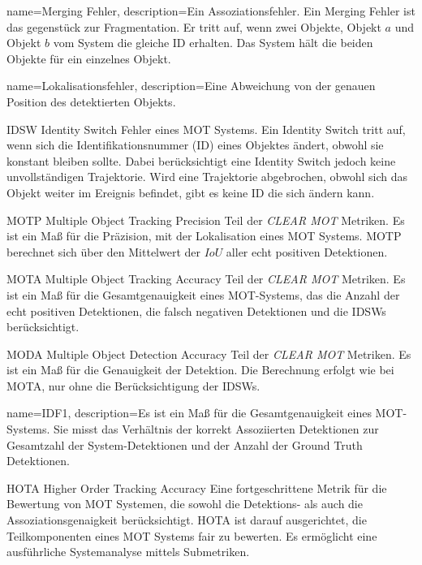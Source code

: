 {
name=Merging Fehler,
description={Ein Assoziationsfehler. Ein Merging Fehler ist das gegenstück zur Fragmentation. Er tritt auf, wenn zwei Objekte, Objekt \(a\) und Objekt \(b\) vom System die gleiche ID erhalten. Das System hält die beiden Objekte für ein einzelnes Objekt.}
}

{
name=Lokalisationsfehler,
description={Eine Abweichung von der genauen Position des detektierten Objekts.}
}

\newglossaryentrywithacronym
{IDSW}
{Identity Switch}
{Fehler eines MOT Systems. Ein Identity Switch tritt auf, wenn sich die Identifikationsnummer (ID) eines Objektes ändert, obwohl sie konstant bleiben sollte. Dabei berücksichtigt eine Identity Switch jedoch keine unvollständigen Trajektorie. Wird eine Trajektorie
abgebrochen, obwohl sich das Objekt weiter im Ereignis befindet, gibt es keine ID die sich
ändern kann.}


\newglossaryentrywithacronym
{MOTP}
{Multiple Object Tracking Precision}
{Teil der \textit{\acrshort{CLEAR} \gls{MOT}} Metriken. Es ist ein Maß für die Präzision, mit der Lokalisation eines MOT Systems. MOTP berechnet sich über den Mittelwert der \(IoU\) aller echt positiven Detektionen.}

\newglossaryentrywithacronym
{MOTA}
{Multiple Object Tracking Accuracy}
{Teil der \textit{\acrshort{CLEAR} \gls{MOT}} Metriken. Es ist ein Maß für die Gesamtgenauigkeit eines MOT-Systems, das die Anzahl der echt positiven Detektionen, die falsch negativen Detektionen und die IDSWs berücksichtigt.}

\newglossaryentrywithacronym
{MODA}
{Multiple Object Detection Accuracy}
{Teil der \textit{\acrshort{CLEAR} \gls{MOT}} Metriken. Es ist ein Maß für die Genauigkeit der Detektion. Die Berechnung erfolgt wie bei MOTA, nur ohne die Berücksichtigung der IDSWs.}

{
name=IDF1,
description={Es ist ein Maß für die Gesamtgenauigkeit eines MOT-Systems. Sie misst das Verhältnis der korrekt Assoziierten Detektionen zur Gesamtzahl der System-Detektionen und der Anzahl der Ground Truth Detektionen.}
}

\newglossaryentrywithacronym
{HOTA}
{Higher Order Tracking Accuracy}
{Eine fortgeschrittene Metrik für die Bewertung von MOT Systemen, die sowohl die Detektions- als auch die Assoziationsgenaigkeit berücksichtigt. HOTA ist darauf ausgerichtet, die Teilkomponenten eines MOT Systems fair zu bewerten. Es ermöglicht eine ausführliche Systemanalyse mittels Submetriken.}

